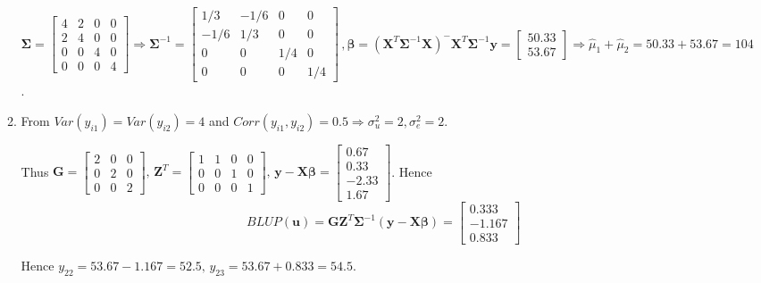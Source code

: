 \documentclass{article}
\begin{document}
\begin{enumerate}[leftmargin = 0 em, label = \arabic*., font = \bfseries]
\begin{enumerate}
		$ \bm \Sigma = \begin{bmatrix}
		 	4 & 2 & 0 & 0\\
		 	2 & 4 & 0 & 0\\
		 	0 & 0 & 4 & 0\\
		 	0 & 0 & 0 & 4
		 \end{bmatrix} \Rightarrow \bm \Sigma^{-1} = \begin{bmatrix}
		 	1/3 & -1/6 & 0 & 0\\
		 	-1/6 & 1/3 & 0 & 0\\
		 	0 & 0 & 1/4 & 0\\
		 	0 & 0 & 0 & 1/4
		 \end{bmatrix}\, ,\bm \beta = (\bm X^T \bm \Sigma^{-1} \bm X)^{-} \bm X^T \bm \Sigma^{-1} \bm y = \begin{bmatrix}
		 	50.33\\ 53.67
		 \end{bmatrix} \Rightarrow \hat{\mu}_{1} + \hat{\mu}_{2} = 50.33 + 53.67 = 104$.

		 \item 
		 From $Var(y_{i1}) = Var(y_{i2}) = 4$ and $Corr(y_{i1}, y_{i2}) = 0.5 \Rightarrow \sigma_u^2 = 2, \sigma_e^2 = 2$. 

		 Thus
		 $\bm G = \begin{bmatrix}
		 	2 & 0 & 0\\
		 	0 & 2 & 0\\
		 	0 & 0 & 2
		 \end{bmatrix},\, \bm Z^T = \begin{bmatrix}
		 	1 & 1 & 0 & 0\\
		 	0 & 0 & 1 & 0\\
		 	0 & 0 & 0 & 1
		 \end{bmatrix},\, 
		 \bm y - \bm X \bm \beta = \begin{bmatrix}
		 	0.67 \\ 0.33 \\ -2.33 \\ 1.67
		 \end{bmatrix}$. Hence 
		 \[BLUP(\bm u) = \bm G \bm Z^T \bm \Sigma^{-1} (\bm y - \bm X \bm \beta) = \begin{bmatrix}
		 	0.333 \\ -1.167 \\ 0.833
		 \end{bmatrix}\]

		 Hence $y_{22} = 53.67 - 1.167 = 52.5,\, y_{23} = 53.67 + 0.833 = 54.5$. 

	\end{enumerate}
	
	
	
	
	
	
	     
\end{enumerate}
	      
\end{document}
